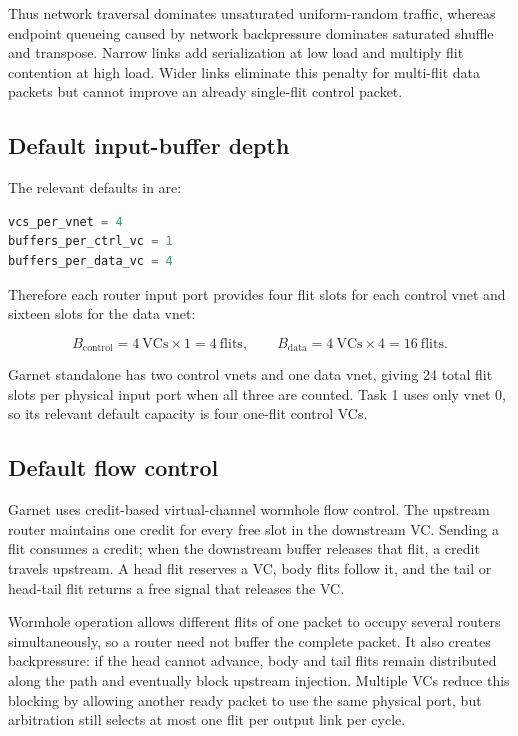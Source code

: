 \documentclass[11pt,a4paper]{article}
\begin{document}
Thus network traversal dominates unsaturated uniform-random traffic, whereas
endpoint queueing caused by network backpressure dominates saturated shuffle
and transpose. Narrow links add serialization at low load and multiply flit
contention at high load. Wider links eliminate this penalty for multi-flit
data packets but cannot improve an already single-flit control packet.

\subsection{Default input-buffer depth}

The relevant defaults in
 are:

\begin{lstlisting}[language=Python]
vcs_per_vnet = 4
buffers_per_ctrl_vc = 1
buffers_per_data_vc = 4
\end{lstlisting}

Therefore each router input port provides four flit slots for each control
vnet and sixteen slots for the data vnet:

\begin{equation}
B_{\mathrm{control}}=4\ \mathrm{VCs}\times1=4\ \mathrm{flits},
\qquad
B_{\mathrm{data}}=4\ \mathrm{VCs}\times4=16\ \mathrm{flits}.
\end{equation}

Garnet standalone has two control vnets and one data vnet, giving 24 total
flit slots per physical input port when all three are counted. Task 1 uses
only vnet 0, so its relevant default capacity is four one-flit control VCs.

\subsection{Default flow control}

Garnet uses credit-based virtual-channel wormhole flow control. The upstream
router maintains one credit for every free slot in the downstream VC. Sending
a flit consumes a credit; when the downstream buffer releases that flit, a
credit travels upstream. A head flit reserves a VC, body flits follow it, and
the tail or head-tail flit returns a free signal that releases the VC.

Wormhole operation allows different flits of one packet to occupy several
routers simultaneously, so a router need not buffer the complete packet. It
also creates backpressure: if the head cannot advance, body and tail flits
remain distributed along the path and eventually block upstream injection.
Multiple VCs reduce this blocking by allowing another ready packet to use the
same physical port, but arbitration still selects at most one flit per output
link per cycle.
\end{document}
